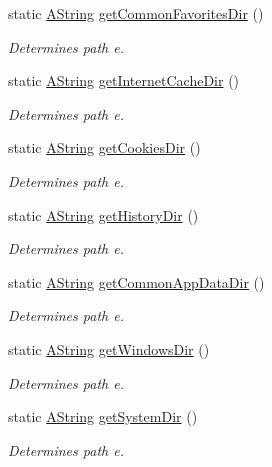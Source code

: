 \begin{DoxyCompactItemize}
static \mbox{\hyperlink{class_a_string}{A\+String}} \mbox{\hyperlink{class_dir_adc99ead17e0a88b4c025ede986501181}{get\+Common\+Favorites\+Dir}} ()
\begin{DoxyCompactList}\small\item\em Determines path e. \end{DoxyCompactList}\item 
static \mbox{\hyperlink{class_a_string}{A\+String}} \mbox{\hyperlink{class_dir_aa55905fc43ee09ec8d6d580bd765dc23}{get\+Internet\+Cache\+Dir}} ()
\begin{DoxyCompactList}\small\item\em Determines path e. \end{DoxyCompactList}\item 
static \mbox{\hyperlink{class_a_string}{A\+String}} \mbox{\hyperlink{class_dir_a8bf7d83aa170fc5d09456719159c337f}{get\+Cookies\+Dir}} ()
\begin{DoxyCompactList}\small\item\em Determines path e. \end{DoxyCompactList}\item 
static \mbox{\hyperlink{class_a_string}{A\+String}} \mbox{\hyperlink{class_dir_a7101f975b15dceba8129052ade89976e}{get\+History\+Dir}} ()
\begin{DoxyCompactList}\small\item\em Determines path e. \end{DoxyCompactList}\item 
static \mbox{\hyperlink{class_a_string}{A\+String}} \mbox{\hyperlink{class_dir_aaa0a0cf7399f3b70358ced7dfcb0e8f9}{get\+Common\+App\+Data\+Dir}} ()
\begin{DoxyCompactList}\small\item\em Determines path e. \end{DoxyCompactList}\item 
static \mbox{\hyperlink{class_a_string}{A\+String}} \mbox{\hyperlink{class_dir_adec7e9d0607805f8c6b7c44a0807b184}{get\+Windows\+Dir}} ()
\begin{DoxyCompactList}\small\item\em Determines path e. \end{DoxyCompactList}\item 
static \mbox{\hyperlink{class_a_string}{A\+String}} \mbox{\hyperlink{class_dir_a307bfc5297772f851f8dd1491974f80c}{get\+System\+Dir}} ()
\begin{DoxyCompactList}\small\item\em Determines path e. \end{DoxyCompactList}\item 

\end{DoxyCompactItemize}

